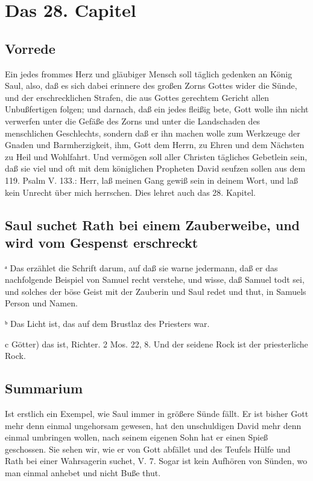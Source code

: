\chapter{Das 28. Capitel}

\section{Vorrede}

Ein jedes frommes Herz und gläubiger Mensch soll täglich gedenken an König Saul, also, daß es sich dabei erinnere des großen Zorns Gottes wider die Sünde, und der erschrecklichen Strafen, die aus Gottes gerechtem Gericht allen Unbußfertigen folgen; und darnach, daß ein jedes fleißig bete, Gott wolle ihn nicht verwerfen unter die Gefäße des Zorns und unter die Landschaden des menschlichen Geschlechts, sondern daß er ihn machen wolle zum Werkzeuge der Gnaden und Barmherzigkeit, ihm, Gott dem Herrn, zu Ehren und dem Nächsten zu Heil und Wohlfahrt. Und vermögen soll aller Christen tägliches Gebetlein sein, daß sie viel und oft mit dem königlichen Propheten David seufzen sollen aus dem 119. Psalm V. 133.: Herr, laß meinen Gang gewiß sein in deinem Wort, und laß kein Unrecht über mich herrschen. Dies lehret auch das 28. Kapitel.

\section[Saul suchet Rath bei einem Zauberweibe, und wird]{Saul suchet Rath bei einem Zauberweibe, und wird vom Gespenst erschreckt}

ᵃ Das erzählet die Schrift darum, auf daß sie warne jedermann, daß er das nachfolgende Beispiel von Samuel recht verstehe, und wisse, daß Samuel todt sei, und solches der böse Geist mit der Zauberin und Saul redet und thut, in Samuels Person und Namen.

ᵇ Das Licht ist, das auf dem Brustlaz des Priesters war.

c Götter) das ist, Richter. 2 Mos. 22, 8. Und der seidene Rock ist der priesterliche Rock.

\section{Summarium}

Ist erstlich ein Exempel, wie Saul immer in größere Sünde fällt. Er ist bisher Gott mehr denn einmal ungehorsam gewesen, hat den unschuldigen David mehr denn einmal umbringen wollen, nach seinem eigenen Sohn hat er einen Spieß geschossen. Sie sehen wir, wie er von Gott abfället und des Teufels Hülfe und Rath bei einer Wahrsagerin suchet, V. 7. Sogar ist kein Aufhören von Sünden, wo man einmal anhebet und nicht Buße thut.

